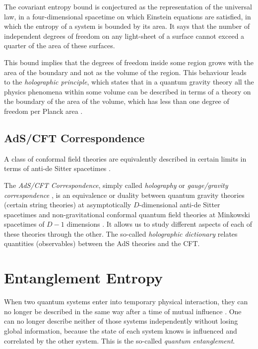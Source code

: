 \documentclass[twocolumn]{revtex4}
\begin{document}
The covariant entropy bound \cite{bousso_covariant_1999} is conjectured as the representation of the universal law, in a four-dimensional spacetime on which Einstein equations are satisfied, in which the entropy of a system is bounded by its area. It says that the number of independent degrees of freedom on any light-sheet of a surface cannot exceed a quarter of the area of these surfaces.

This bound implies that the degrees of freedom inside some region grows with the area of the boundary and not as the volume of the region. This behaviour leads to the \textit{holographic principle}, which states that in a quantum gravity theory all the physics phenomena within some volume can be described in terms of a theory on the boundary of the area of the volume, which has less than one degree of freedom per Planck area \cite{t_hooft_dimensional_2009}.


\subsection{AdS/CFT Correspondence} \label{ss:AdS/CFT}

A class of conformal field theories are equivalently described in certain limits in terms of anti-de Sitter spacetimes \cite{rangamani_holographic_2017}.

The \textit{AdS/CFT Correspondence}, simply called \textit{holography} or \textit{gauge/gravity correspondence} \cite{ramallo_introduction_2013}, is an equivalence or duality between quantum gravity theories (certain string theories) at asymptotically $D$-dimensional anti-de Sitter spacetimes and non-gravitational conformal quantum field theories at Minkowski spacetimes of $D-1$ dimensions \cite{maldacena_large_1999}. It allows us to study different aspects of each of these theories through the other. The so-called \textit{holographic dictionary} relates quantities (observables) between the AdS theories and the CFT. %


\section{Entanglement Entropy} \label{s:EE}

When two quantum systems enter into temporary physical interaction, they can no longer be described in the same way after a time of mutual influence \cite{schrodinger_discussion_1935}. One can no longer describe neither of those systems independently without losing global information, because the state of each system knows is influenced and correlated by the other system. This is the so-called \textit{quantum entanglement}.
\end{document}
